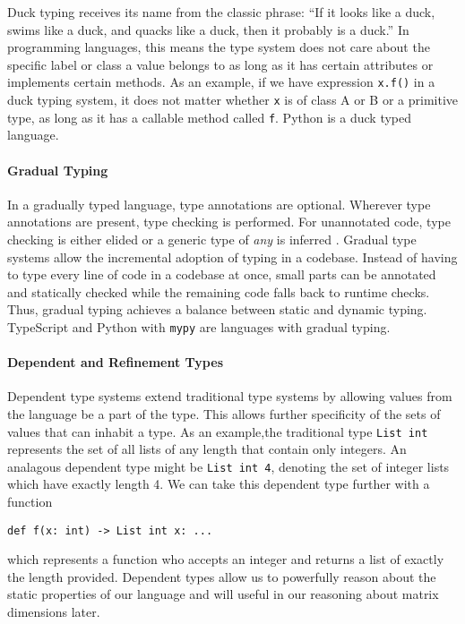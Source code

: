 \documentclass{book}
\begin{document}
Duck typing receives its name from the classic phrase: ``If it looks like a duck, swims like a duck, and quacks like a duck, then it probably is a duck.'' In programming languages, this means the type system does not care about the specific label or class a value belongs to as long as it has certain attributes or implements certain methods. As an example, if we have expression \texttt{x.f()} in a duck typing system, it does not matter whether \texttt{x} is of class A or B or a primitive type, as long as it has a callable method called \texttt{f}. Python is a duck typed language.

\paragraph{Gradual Typing}

In a gradually typed language, type annotations are optional. Wherever type annotations are present, type checking is performed. For unannotated code, type checking is either elided or a generic type of \textit{any} is inferred \cite{PythonDropbox}. Gradual type systems allow the incremental adoption of typing in a codebase. Instead of having to type every line of code in a codebase at once, small parts can be annotated and statically checked while the remaining code falls back to runtime checks. Thus, gradual typing achieves a balance between static and dynamic typing. TypeScript and Python with \texttt{mypy} are languages with gradual typing.

\paragraph{Dependent and Refinement Types}

Dependent type systems extend traditional type systems by allowing values from the language be a part of the type. This allows further specificity of the sets of values that can inhabit a type. As an example,the traditional type \texttt{List int} represents the set of all lists of any length that contain only integers. An analagous dependent type might be \texttt{List int 4}, denoting the set of integer lists which have exactly length 4. We can take this dependent type further with a function
\begin{verbatim}
def f(x: int) -> List int x: ...\end{verbatim}
which represents a function who accepts an integer and returns a list of exactly the length provided. Dependent types allow us to powerfully reason about the static properties of our language and will useful in our reasoning about matrix dimensions later.
\end{document}
